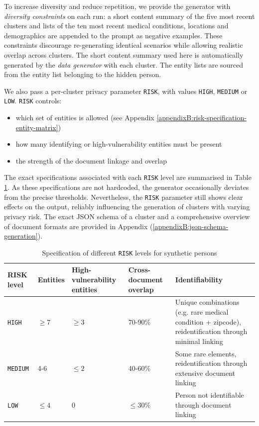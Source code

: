 To increase diversity and reduce repetition, we provide the generator with \textit{diversity constraints} on each run: a short content summary of the five most recent clusters and lists of the ten most recent medical conditions, locations and demographics are appended to the prompt as negative examples. These constraints discourage re-generating identical scenarios while allowing realistic overlap across clusters. The short content summary used here is automatically generated by the \textit{data generator} with each cluster. The entity lists are sourced from the entity list belonging to the hidden person.

We also pass a per-cluster privacy parameter \texttt{RISK}, with values \texttt{HIGH}, \texttt{MEDIUM} or \texttt{LOW}. \texttt{RISK} controls:
\begin{itemize}
  \item which set of entities is allowed (see Appendix \ref{appendixB:risk-specification-entity-matrix})
  \item how many identifying or high-vulnerability entities must be present
  \item the strength of the document linkage and overlap
\end{itemize}
 
The exact specifications associated with each \texttt{RISK} level are summarised in Table \ref{evaluation-tab:data-gen-risk-profiles}. As these specifications are not hardcoded, the generator occasionally deviates from the precise thresholds. Nevertheless, the \texttt{RISK} parameter still shows clear effects on the output, reliably influencing the generation of clusters with varying privacy risk. The exact JSON schema of a cluster and a comprehensive overview of document formats are provided in Appendix (\ref{appendixB:json-schema-generation}).

\begin{table}[h]
\centering
\caption{Specification of different \texttt{RISK} levels for synthetic persons}
\label{evaluation-tab:data-gen-risk-profiles}
\begin{tabular}{l m{1.5cm} m{2cm} m{2cm} m{5cm}}
\hline
\textbf{RISK level} & \textbf{Entities} & \textbf{High-vulnerability entities} & \textbf{Cross-document overlap} & \textbf{Identifiability} \\
\hline
\texttt{HIGH} & $\geq 7$ & $\geq 3$ & 70-90\% & Unique combinations (e.g. rare medical condition + zipcode), reidentification through minimal linking \\[25pt]
\texttt{MEDIUM} & 4-6 & $\leq 2$ & 40-60\% & Some rare elements, reidentification through extensive document linking \\[25pt]
\texttt{LOW} & $\leq 4$ & 0 & $\leq 30\%$ & Person not identifiable through document linking \\
\hline
\end{tabular}
\end{table}



